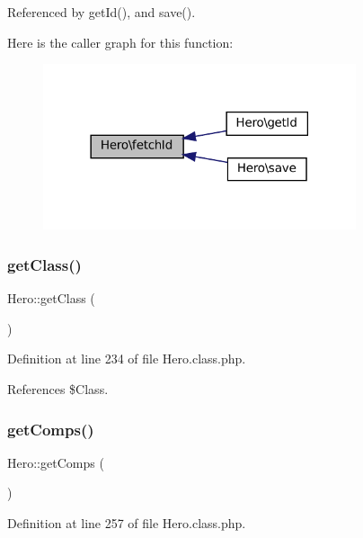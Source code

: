 Referenced by get\+Id(), and save().

Here is the caller graph for this function\+:\nopagebreak
\begin{figure}[H]
\begin{center}
\leavevmode
\includegraphics[width=261pt]{class_hero_a5aa91e7ea559a59c8151845a855fd546_icgraph}
\end{center}
\end{figure}
\mbox{\label{class_hero_ae8f80050c2256fc2f95c83748257210d}} 
\subsubsection{\texorpdfstring{get\+Class()}{getClass()}}
{\footnotesize\ttfamily Hero\+::get\+Class (\begin{DoxyParamCaption}{ }\end{DoxyParamCaption})}



Definition at line 234 of file Hero.\+class.\+php.



References \$\+Class.

\mbox{\label{class_hero_a5ca87b00dc40de9c61642c293f8f739a}} 
\subsubsection{\texorpdfstring{get\+Comps()}{getComps()}}
{\footnotesize\ttfamily Hero\+::get\+Comps (\begin{DoxyParamCaption}{ }\end{DoxyParamCaption})}



Definition at line 257 of file Hero.\+class.\+php.



